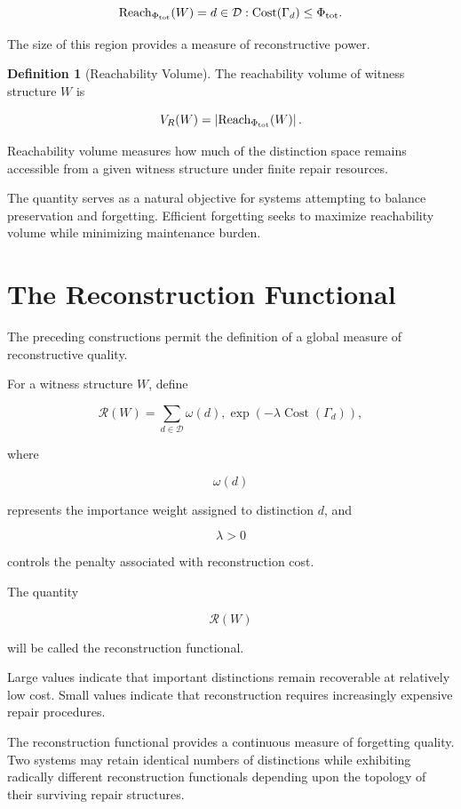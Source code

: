 \documentclass[12pt,oneside]{book}
\theoremstyle{plain} \newtheorem{theorem}{Theorem}[chapter] \newtheorem{lemma}[theorem]{Lemma} \newtheorem{proposition}[theorem]{Proposition} \newtheorem{corollary}[theorem]{Corollary}
\theoremstyle{definition} \newtheorem{definition}[theorem]{Definition} \newtheorem{axiom}[theorem]{Axiom} \newtheorem{construction}[theorem]{Construction}
\theoremstyle{remark} \newtheorem{remark}[theorem]{Remark} \newtheorem{example}[theorem]{Example}
\newcommand{\D}{\mathcal{D}} \newcommand{\R}{\mathcal{R}} \newcommand{\F}{\mathcal{F}} \newcommand{\U}{\mathcal{U}} \newcommand{\M}{\mathcal{M}} \newcommand{\G}{\Gamma}
\begin{document}
\[
\Reach_{\Phi_{\mathrm{tot}}}(W)
=
{
d\in\D
:
\operatorname{Cost}(\Gamma_d)
\leq
\Phi_{\mathrm{tot}}
}.
\]

The size of this region provides a measure of reconstructive power.

\begin{definition}[Reachability Volume]

The reachability volume of witness structure $W$ is

\[
V_R(W)
=
\left|
\operatorname{Reach}_{\Phi_{\mathrm{tot}}}(W)
\right|.
\]

\end{definition}

Reachability volume measures how much of the distinction space remains accessible from a given witness structure under finite repair resources.

The quantity serves as a natural objective for systems attempting to balance preservation and forgetting. Efficient forgetting seeks to maximize reachability volume while minimizing maintenance burden.

\section{The Reconstruction Functional}

The preceding constructions permit the definition of a global measure of reconstructive quality.

For a witness structure $W$, define

\[
\mathcal R(W)
=
\sum_{d\in\D}
\omega(d)
,
\exp
\left(
-\lambda
\operatorname{Cost}(\Gamma_d)
\right),
\]

where

\[
\omega(d)
\]

represents the importance weight assigned to distinction $d$, and

\[
\lambda>0
\]

controls the penalty associated with reconstruction cost.

The quantity

\[
\mathcal R(W)
\]

will be called the reconstruction functional.

Large values indicate that important distinctions remain recoverable at relatively low cost. Small values indicate that reconstruction requires increasingly expensive repair procedures.

The reconstruction functional provides a continuous measure of forgetting quality. Two systems may retain identical numbers of distinctions while exhibiting radically different reconstruction functionals depending upon the topology of their surviving repair structures.
\end{document}
